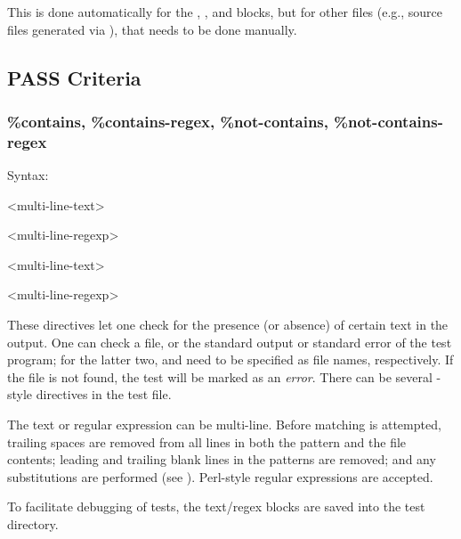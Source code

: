 This is done automatically for the , ,
and  blocks, but for other files (e.g., source files generated
via ), that needs to be done manually.


\subsection{PASS Criteria}
\label{sec:testing:opptest:pass-criteria}

\subsubsection{\%contains, \%contains-regex, \%not-contains, \%not-contains-regex}
\label{sec:testing:opptest:contains-and-co}

Syntax:

\begin{filelisting}
<multi-line-text>
\end{filelisting}

\begin{filelisting}
<multi-line-regexp>
\end{filelisting}

\begin{filelisting}
<multi-line-text>
\end{filelisting}

\begin{filelisting}
<multi-line-regexp>
\end{filelisting}

These directives let one check for the presence (or absence) of certain text in
the output. One can check a file, or the standard output or standard error of
the test program; for the latter two,  and  need to be
specified as file names, respectively. If the file is not found, the test will be marked
as an \textit{error}. There can be several -style directives
in the test file.

The text or regular expression can be multi-line. Before matching is attempted,
trailing spaces are removed from all lines in both the pattern and the
file contents; leading and trailing blank lines in the patterns are removed;
and any substitutions are performed (see ). Perl-style regular
expressions are accepted.

To facilitate debugging of tests, the text/regex blocks are saved into
the test directory.


